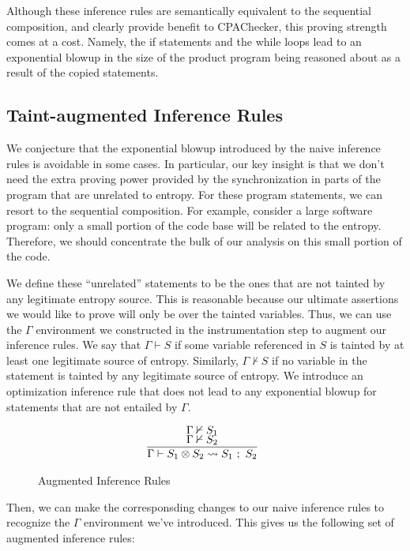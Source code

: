 \documentclass[letterpaper,twocolumn,10pt]{article}
\newcommand{\cross}{\otimes{}}
\begin{document}
Although these inference rules are semantically equivalent to the sequential composition, and clearly provide benefit to CPAChecker, this proving strength comes at a cost. Namely, the if statements and the while loops lead to an exponential blowup in the size of the product program being reasoned about as a result of the copied statements. 

\subsection{Taint-augmented Inference Rules}

We conjecture that the exponential blowup introduced by the naive inference rules is avoidable in some cases. In particular, our key insight is that we don't need the extra proving power provided by the synchronization in parts of the program that are unrelated to entropy. For these program statements, we can resort to the sequential composition. For example, consider a large software program: only a small portion of the code base will be related to the entropy. Therefore, we should concentrate the bulk of our analysis on this small portion of the code. 

We define these ``unrelated'' statements to be the ones that are not tainted by any legitimate entropy source. This is reasonable because our ultimate assertions we would like to prove will only be over the tainted variables. Thus, we can use the $\Gamma$ environment we constructed in the instrumentation step to augment our inference rules. We say that $\Gamma \vdash S$ if some variable referenced in $S$ is tainted by at least one legitimate source of entropy. Similarly, $\Gamma \nvdash S$ if no variable in the statement is tainted by any legitimate source of entropy. We introduce an optimization inference rule that does not lead to any exponential blowup for statements that are not entailed by $\Gamma$. 

\begin{figure}
    \label{fig:auginfrules1}
    \caption{Augmented Inference Rules}
    \[
		\begin{array}{c}
			\infer[]{\Gamma \vdash S_1 \cross S_2 \leadsto S_1\ ;\ S_2}{
				\Gamma \nvdash S_1 \\
				\Gamma \nvdash S_2
			} \\
		\end{array}
    \]
\end{figure}

Then, we can make the corresponsding changes to our naive inference rules to recognize the $\Gamma$ environment we've introduced. This gives us the following set of augmented inference rules: %
\end{document}
